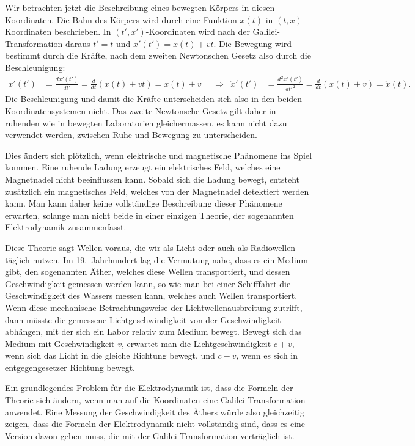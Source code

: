 Wir betrachten jetzt die Beschreibung eines bewegten Körpers in diesen
Koordinaten.
Die Bahn des Körpers wird durch eine Funktion $x(t)$ in $(t,x)$-Koordinaten
beschrieben.
In $(t',x')$-Koordinaten wird nach der Galilei-Transformation daraus
$t'=t$ und $x'(t')=x(t)+vt$.
Die Bewegung wird bestimmt durch die Kräfte, nach dem zweiten Newtonschen
Gesetz also durch die Beschleunigung:
\begin{align}
\dot x'(t')
&=
\frac{dx'(t')}{dt'}
=
\frac{d}{dt}(x(t)+vt)
=
\dot x(t) + v
&&\Rightarrow&
\ddot x'(t')
&=
\frac{d^2x'(t')}{dt'^2}
=
\frac{d}{dt} (\dot x(t) + v)
=
\ddot x(t).
\end{align}
Die Beschleunigung und damit die Kräfte unterscheiden sich also in den
beiden Koordinatensystemen nicht.
Das zweite Newtonsche Gesetz gilt daher in ruhenden wie in bewegten
Laboratorien gleichermassen, es kann nicht dazu verwendet werden, zwischen
Ruhe und Bewegung zu unterscheiden.

Dies ändert sich plötzlich, wenn elektrische und magnetische Phänomene
ins Spiel kommen.
Eine ruhende Ladung erzeugt ein elektrisches Feld, welches eine Magnetnadel
nicht beeinflussen kann.
Sobald sich die Ladung bewegt, entsteht zusätzlich ein magnetisches Feld,
welches von der Magnetnadel detektiert werden kann.
Man kann daher keine voll\-ständige Beschreibung dieser Phänomene erwarten,
solange man nicht beide in einer einzigen Theorie, der sogenannten
Elektrodynamik zusammenfasst.

Diese Theorie sagt Wellen voraus, die wir als Licht oder auch als Radiowellen
täglich nutzen.
Im 19.~Jahrhundert lag die Vermutung nahe, dass es ein Medium gibt,
den sogenannten Äther, welches
diese Wellen transportiert, und dessen Geschwindigkeit gemessen werden
kann, so wie man bei einer Schifffahrt die Geschwindigkeit des Wassers
messen kann, welches auch Wellen transportiert.
Wenn diese mechanische Betrachtungsweise der Lichtwellenausbreitung
zutrifft, dann müsste die gemessene Lichtgeschwindigkeit von der
Geschwindigkeit abhängen, mit der sich ein Labor relativ zum Medium
bewegt.
Bewegt sich das Medium mit Geschwindigkeit $v$, erwartet man die
Lichtgeschwindigkeit $c+v$, wenn sich das Licht in die gleiche Richtung
bewegt, und $c-v$, wenn es sich in entgegengesetzer Richtung bewegt.

Ein grundlegendes Problem für die Elektrodynamik ist, dass die
Formeln der Theorie sich ändern, wenn man auf die Koordinaten eine
Galilei-Transformation anwendet.
Eine Messung der Geschwindigkeit des Äthers würde also gleichzeitig
zeigen, dass die Formeln der Elektrodynamik nicht voll\-ständig sind,
dass es eine Version davon geben muss, die mit der Galilei-Transformation
verträglich ist.

